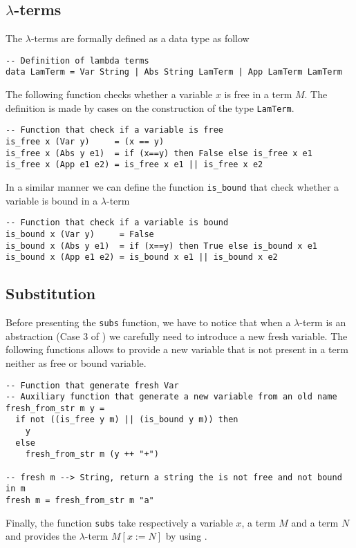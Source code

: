 \documentclass[a4paper,11pt]{article}
\theoremstyle{definition}
\begin{document}
\subsection{$\lambda$-terms}
The $\lambda$-terms are formally defined as a data type as follow
\begin{verbatim}
-- Definition of lambda terms
data LamTerm = Var String | Abs String LamTerm | App LamTerm LamTerm
\end{verbatim}
The following function checks whether a variable $x$ is free in a term $M$.
The definition is made by cases on the construction of the type
\texttt{LamTerm}.
\begin{verbatim}
-- Function that check if a variable is free
is_free x (Var y)     = (x == y)
is_free x (Abs y e1)  = if (x==y) then False else is_free x e1
is_free x (App e1 e2) = is_free x e1 || is_free x e2 
\end{verbatim}

In a similar manner we can define the function \texttt{is\_bound} that check
whether a variable is bound in a $\lambda$-term
\begin{verbatim}
-- Function that check if a variable is bound
is_bound x (Var y)     = False
is_bound x (Abs y e1)  = if (x==y) then True else is_bound x e1
is_bound x (App e1 e2) = is_bound x e1 || is_bound x e2 
\end{verbatim}

\subsection{Substitution}
Before presenting the \texttt{subs} function, we have to notice that when a
$\lambda$-term is an abstraction (Case 3 of ) we carefully
need to introduce a new fresh variable. The following functions allows to
provide a new variable that is not present in a term neither as free or bound
variable.

\begin{verbatim}
-- Function that generate fresh Var
-- Auxiliary function that generate a new variable from an old name
fresh_from_str m y = 
  if not ((is_free y m) || (is_bound y m)) then 
    y 
  else
    fresh_from_str m (y ++ "+")

-- fresh m --> String, return a string the is not free and not bound in m 
fresh m = fresh_from_str m "a"
\end{verbatim}

Finally, the function \texttt{subs} take respectively a variable $x$, a term
$M$ and a term $N$ and provides the $\lambda$-term $M[x:=N]$ by using .
\end{document}
